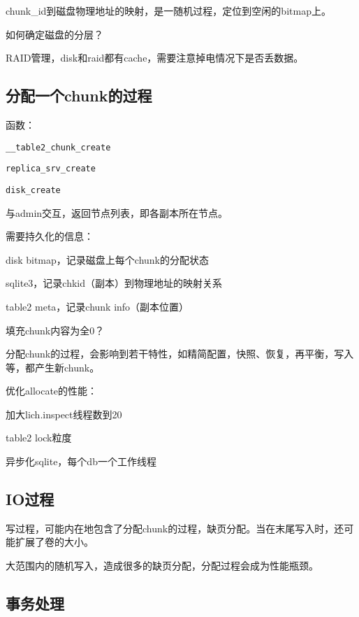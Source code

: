 chunk\_id到磁盘物理地址的映射，是一随机过程，定位到空闲的bitmap上。

如何确定磁盘的分层？

RAID管理，disk和raid都有cache，需要注意掉电情况下是否丢数据。

\subsection{分配一个chunk的过程}

函数：
\begin{compactitem}
\item \verb|__table2_chunk_create|
\item \verb|replica_srv_create|
\item \verb|disk_create|
\end{compactitem}

与admin交互，返回节点列表，即各副本所在节点。

需要持久化的信息：
\begin{compactitem}
\item disk bitmap，记录磁盘上每个chunk的分配状态
\item sqlite3，记录chkid（副本）到物理地址的映射关系
\item table2 meta，记录chunk info（副本位置）
\item 填充chunk内容为全0？
\end{compactitem}

分配chunk的过程，会影响到若干特性，如精简配置，快照、恢复，再平衡，写入等，都产生新chunk。

优化allocate的性能：
\begin{compactitem}
\item 加大lich.inspect线程数到20
\item table2 lock粒度 
\item 异步化sqlite，每个db一个工作线程
\end{compactitem}

\subsection{IO过程}

写过程，可能内在地包含了分配chunk的过程，缺页分配。当在末尾写入时，还可能扩展了卷的大小。

大范围内的随机写入，造成很多的缺页分配，分配过程会成为性能瓶颈。

\subsection{事务处理}

